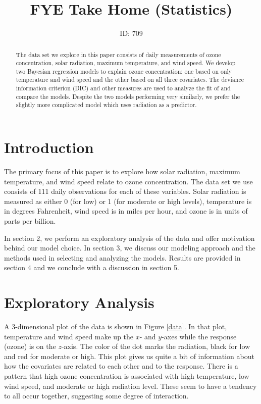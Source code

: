 \documentclass{asaproc}
\title{FYE Take Home (Statistics)}
\author{ID: 709}
\begin{document}
\maketitle

\begin{abstract}
The data set we explore in this paper consists of daily measurements of ozone concentration, solar radiation, maximum temperature, and wind speed. We develop two Bayesian regression models to explain ozone concentration: one based on only temperature and wind speed and the other based on all three covariates. The deviance information criterion (DIC) and other measures are used to analyze the fit of and compare the models. Despite the two models performing very similarly, we prefer the slightly more complicated model which uses radiation as a predictor.
\end{abstract}

\section{Introduction}

The primary focus of this paper is to explore how solar radiation, maximum temperature, and wind speed relate to ozone concentration. The data set we use consists of 111 daily observations for each of these variables. Solar radiation is measured as either 0 (for low) or 1 (for moderate or high levels), temperature is in degrees Fahrenheit, wind speed is in miles per hour, and ozone is in units of parts per billion.

In section 2, we perform an exploratory analysis of the data and offer motivation behind our model choice. In section 3, we discuss our modeling approach and the methods used in selecting and analyzing the models. Results are provided in section 4 and we conclude with a discussion in section 5.

\section{Exploratory Analysis}

A 3-dimensional plot of the data is shown in Figure \ref{data}. In that plot, temperature and wind speed make up the $x$- and $y$-axes while the response (ozone) is on the $z$-axis. The color of the dot marks the radiation, black for low and red for moderate or high. This plot gives us quite a bit of information about how the covariates are related to each other and to the response. There is a pattern that high ozone concentration is associated with high temperature, low wind speed, and moderate or high radiation level. These seem to have a tendency to all occur together, suggesting some degree of interaction.
\end{document}
